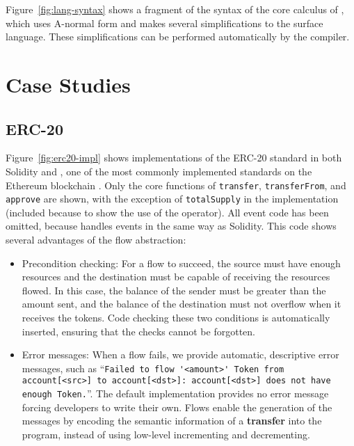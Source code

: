 \documentclass[sigconf]{acmart}
\begin{document}
Figure~\ref{fig:lang-syntax} shows a fragment of the syntax of the core calculus of \langName, which uses A-normal form  and makes several simplifications to the surface \langName language.
These simplifications can be performed automatically by the compiler.

\section{Case Studies}
\subsection{ERC-20}

Figure~\ref{fig:erc20-impl} shows implementations of the ERC-20  standard in both Solidity and \langName, one of the most commonly implemented standards on the Ethereum blockchain .
Only the core functions of \lstinline{transfer}, \lstinline{transferFrom}, and \lstinline{approve} are shown, with the exception of \lstinline{totalSupply} in the \langName implementation (included because to show the use of the \total operator).
All event code has been omitted, because \langName handles events in the same way as Solidity.
This code shows several advantages of the flow abstraction:
\begin{itemize}
    \item Precondition checking: For a flow to succeed, the source must have enough resources and the destination must be capable of receiving the resources flowed.
        In this case, the balance of the sender must be greater than the amount sent, and the balance of the destination must not overflow when it receives the tokens.
        Code checking these two conditions is automatically inserted, ensuring that the checks cannot be forgotten.
    \item Error messages: When a flow fails, we provide  automatic, descriptive error messages, such as ``\lstinline{Failed to flow '<amount>' Token from account[<src>] to account[<dst>]: account[<dst>] does not have enough Token.}''.
        The default implementation provides no error message forcing developers to write their own.
        Flows enable the generation of the messages by encoding the semantic information of a \textbf{transfer} into the program, instead of using low-level incrementing and decrementing.
\end{itemize}
\end{document}
